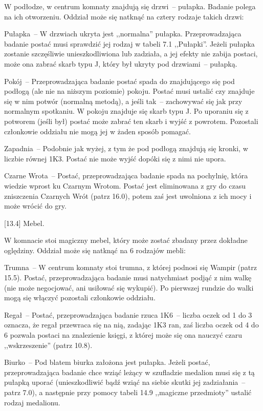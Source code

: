 W podłodze, w centrum komnaty znajdują się drzwi~-- pułapka.
Badanie polega na ich otworzeniu.
Oddział może się natknąć na cztery rodzaje takich drzwi:

Pułapka~-- W drzwiach ukryta jest ,,normalna'' pułapka.
Przeprowadzająca badanie postać musi sprawdzić jej rodzaj w tabeli 7.1 ,,Pułapki''.
Jeżeli pułapka zostanie szczęśliwie unieszkodliwiona lub zadziała, a jej efekty nie zabija postaci, może ona zabrać skarb typu J, który był ukryty pod drzwiami~-- pułapką.

Pokój~-- Przeprowadzająca badanie postać spada do znajdującego się pod podłogą (ale nie na niższym poziomie) pokoju.
Postać musi ustalić czy znajduje się w nim potwór (normalną metodą), a jeśli tak~-- zachowywać się jak przy normalnym spotkaniu.
W pokoju znajduje się skarb typu J.
Po uporaniu się z potworem (jeśli był) postać może zabrać ten skarb i wyjść z powrotem.
Pozostali członkowie oddziału nie mogą jej w żaden sposób pomagać.

Zapadnia~-- Podobnie jak wyżej, z tym że pod podłogą znajdują się kronki, w liczbie równej 1K3.
Postać nie może wyjść dopóki się z nimi nie upora.

Czarne Wrota~-- Postać, przeprowadzająca badanie spada na pochylnię, która wiedzie wprost ku Czarnym Wrotom.
Postać jest eliminowana z gry do czasu zniszczenia Czarnych Wrót (patrz 16.0), potem zaś jest uwolniona z ich mocy i może wrócić do gry.

[13.4] Mebel.

W komnacie stoi magiczny mebel, który może zostać zbadany przez dokładne oględziny.
Oddział może się natknąć na 6 rodzajów mebli:

Trumna~-- W centrum komnaty stoi trumna, z której podnosi się Wampir (patrz 15.5).
Postać, przeprowadzająca badanie musi natychmiast podjąć z nim walkę (nie może negocjować, ani usiłować się wykupić).
Po pierwszej rundzie do walki mogą się włączyć pozostali członkowie oddziału.

Regał~-- Postać, przeprowadzająca badanie rzuca 1K6~-- liczba oczek od 1 do 3 oznacza, że regał przewraca się na nią, zadając 1K3 ran, zaś liczba oczek od 4 do 6 pozwala postaci na znalezienie księgi, z której może się ona nauczyć czaru ,,wskrzeszenie'' (patrz 10.8).

Biurko~-- Pod blatem biurka założona jest pułapka.
Jeżeli postać, przeprowadzająca badanie chce wziąć leżący w szufladzie medalion musi się z tą pułapką uporać (unieszkodliwić bądź wziąć na siebie skutki jej zadziałania~-- patrz 7.0), a następnie przy pomocy tabeli 14.9 ,,magiczne przedmioty'' ustalić rodzaj medalionu.

